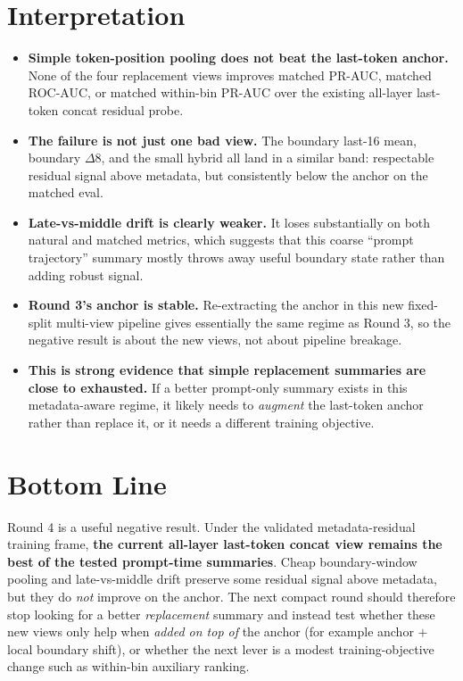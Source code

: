 \documentclass[11pt]{article}
\begin{document}
\section*{Interpretation}
\begin{itemize}
  \item \textbf{Simple token-position pooling does not beat the last-token anchor.} None of the four replacement views improves matched PR-AUC, matched ROC-AUC, or matched within-bin PR-AUC over the existing all-layer last-token concat residual probe.
  \item \textbf{The failure is not just one bad view.} The boundary last-16 mean, boundary $\Delta8$, and the small hybrid all land in a similar band: respectable residual signal above metadata, but consistently below the anchor on the matched eval.
  \item \textbf{Late-vs-middle drift is clearly weaker.} It loses substantially on both natural and matched metrics, which suggests that this coarse ``prompt trajectory'' summary mostly throws away useful boundary state rather than adding robust signal.
  \item \textbf{Round 3's anchor is stable.} Re-extracting the anchor in this new fixed-split multi-view pipeline gives essentially the same regime as Round 3, so the negative result is about the new views, not about pipeline breakage.
  \item \textbf{This is strong evidence that simple replacement summaries are close to exhausted.} If a better prompt-only summary exists in this metadata-aware regime, it likely needs to \emph{augment} the last-token anchor rather than replace it, or it needs a different training objective.
\end{itemize}

\section*{Bottom Line}
Round 4 is a useful negative result. Under the validated metadata-residual training frame, \textbf{the current all-layer last-token concat view remains the best of the tested prompt-time summaries}. Cheap boundary-window pooling and late-vs-middle drift preserve some residual signal above metadata, but they do \emph{not} improve on the anchor. The next compact round should therefore stop looking for a better \emph{replacement} summary and instead test whether these new views only help when \emph{added on top of} the anchor (for example anchor $+$ local boundary shift), or whether the next lever is a modest training-objective change such as within-bin auxiliary ranking.
\end{document}
